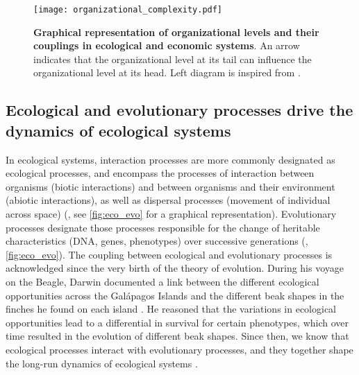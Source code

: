 \begin{figure}[ht]
    \centering
    \texttt{[image: organizational\_complexity.pdf]}
\caption{\textbf{Graphical representation of organizational levels and their couplings in ecological and economic systems}. An arrow indicates that the organizational level at its tail can influence the organizational level at its head. Left diagram is inspired from \cite{Hendry+2016}.}
\label{fig:organisational_levels}
\end{figure}

\subsection{Ecological and evolutionary processes drive the dynamics of ecological systems}
 
In ecological systems, interaction processes are more commonly designated as ecological processes, and encompass the processes of interaction between organisms (biotic interactions) and between organisms and their environment (abiotic interactions), as well as dispersal processes (movement of individual across space) (\cite{Vellend2010a}, see \cref{fig:eco_evo} for a graphical representation).
% 
Evolutionary processes designate those processes responsible for the change of heritable characteristics (DNA, genes, phenotypes) over successive generations (\cite{Hall2013}, \cref{fig:eco_evo}).
% 
The coupling between ecological and evolutionary processes is acknowledged since the very birth of the theory of evolution. 
% 
During his voyage on the Beagle, Darwin documented a link between the different ecological opportunities across the Galápagos Islands and the different beak shapes in the finches he found on each island \citep{darwin2004origin}.
% 
He reasoned that the variations in ecological opportunities lead to a differential in survival for certain phenotypes, which over time resulted in the evolution of different beak shapes.
% 
Since then, we know that ecological processes interact with evolutionary processes, and they together shape the long-run dynamics of ecological systems \citep{Urban2016,Rahbek2019a,Rangel2018,Hagen2022}.

